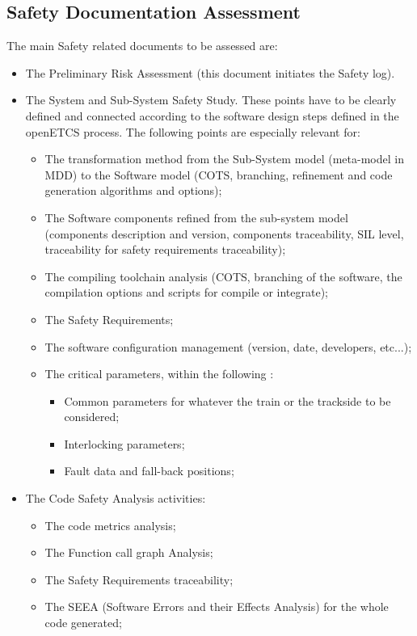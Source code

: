 \documentclass[openetcs]{template/openetcs_article}
\begin{document}
\subsection{Safety Documentation Assessment}
The main Safety related documents to be assessed are:
\begin{itemize}
\item The Preliminary Risk Assessment (this document initiates the Safety log).
\item The System and Sub-System Safety Study. These points have to be clearly defined and connected according to the software design steps defined in the openETCS process. The following points are especially relevant for:
	\begin{itemize}
\item The transformation method from the Sub-System model (meta-model in MDD) to the Software model (COTS, branching, refinement and code generation algorithms
and options);
\item The Software components refined from the sub-system model (components description and version, components traceability, SIL level, traceability for safety
requirements traceability);
	\item The compiling toolchain analysis (COTS, branching of the software, the compilation options and scripts for compile or integrate);
	\item The Safety Requirements;
	\item The software configuration management (version, date, developers, etc...);
	\item The critical parameters, within the following :
		\begin{itemize}
		\item Common parameters for whatever the train or the trackside to be considered;
		\item Interlocking parameters;
		\item Fault data and fall-back positions;
		\end{itemize}
	\end{itemize}
\item The Code Safety Analysis activities:
	\begin{itemize}
	\item The code metrics analysis;
	\item The Function call graph Analysis;
	\item The Safety Requirements traceability;
	\item The SEEA (Software Errors and their Effects Analysis) for the whole code generated;

\end{itemize}
\end{itemize}
\end{document}
